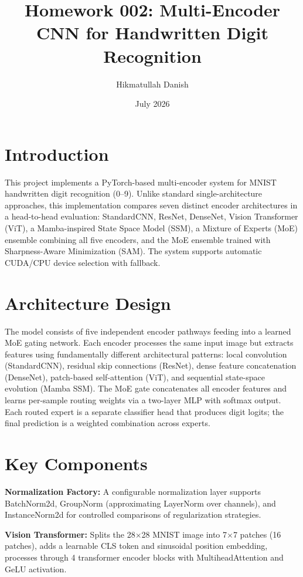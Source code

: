 \documentclass[12pt,a4paper]{article}
\title{Homework 002: Multi-Encoder CNN for Handwritten Digit Recognition}
\author{Hikmatullah Danish \quad 3125999089}
\date{July 2026}
\begin{document}
\maketitle

\section{Introduction}
This project implements a PyTorch-based multi-encoder system for MNIST handwritten digit recognition (0--9). Unlike standard single-architecture approaches, this implementation compares seven distinct encoder architectures in a head-to-head evaluation: StandardCNN, ResNet, DenseNet, Vision Transformer (ViT), a Mamba-inspired State Space Model (SSM), a Mixture of Experts (MoE) ensemble combining all five encoders, and the MoE ensemble trained with Sharpness-Aware Minimization (SAM). The system supports automatic CUDA/CPU device selection with fallback.

\section{Architecture Design}
The model consists of five independent encoder pathways feeding into a learned MoE gating network. Each encoder processes the same input image but extracts features using fundamentally different architectural patterns: local convolution (StandardCNN), residual skip connections (ResNet), dense feature concatenation (DenseNet), patch-based self-attention (ViT), and sequential state-space evolution (Mamba SSM). The MoE gate concatenates all encoder features and learns per-sample routing weights via a two-layer MLP with softmax output. Each routed expert is a separate classifier head that produces digit logits; the final prediction is a weighted combination across experts.

\section{Key Components}
\textbf{Normalization Factory:} A configurable normalization layer supports BatchNorm2d, GroupNorm (approximating LayerNorm over channels), and InstanceNorm2d for controlled comparisons of regularization strategies.

\textbf{Vision Transformer:} Splits the 28$\times$28 MNIST image into 7$\times$7 patches (16 patches), adds a learnable CLS token and sinusoidal position embedding, processes through 4 transformer encoder blocks with MultiheadAttention and GeLU activation.
\end{document}
